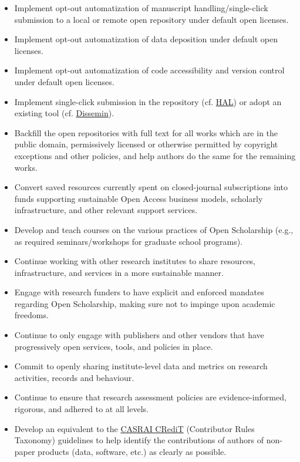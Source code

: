 \begin{itemize}
\item
  Implement opt-out automatization of manuscript handling/single-click
  submission to a local or remote open repository under default open
  licenses.
\item
  Implement opt-out automatization of data deposition under default open
  licenses.
\item
  Implement opt-out automatization of code accessibility and version
  control under default open licenses.
\item
  Implement single-click submission in the repository (cf.
  \href{https://www.ccsd.cnrs.fr/en/2018/06/new-interface-for-submitting-in-hal-a-first-assessment/}{HAL})
  or adopt an existing tool (cf. \href{https://dissem.in/}{Dissemin}).
\item
  Backfill the open repositories with full text for all works which are
  in the public domain, permissively licensed or otherwise permitted by
  copyright exceptions and other policies, and help authors do the same
  for the remaining works.
\item
  Convert saved resources currently spent on closed-journal
  subscriptions into funds supporting sustainable Open Access business
  models, scholarly infrastructure, and other relevant support services.
\item
  Develop and teach courses on the various practices of Open Scholarship
  (e.g., as required seminars/workshops for graduate school programs).
\item
  Continue working with other research institutes to share resources,
  infrastructure, and services in a more sustainable manner.
\item
  Engage with research funders to have explicit and enforced mandates
  regarding Open Scholarship, making sure not to impinge upon academic
  freedoms.
\item
  Continue to only engage with publishers and other vendors that have
  progressively open services, tools, and policies in place.
\item
  Commit to openly sharing institute-level data and metrics on research
  activities, records and behaviour.
\item
  Continue to ensure that research assessment policies are
  evidence-informed, rigorous, and adhered to at all levels.
\item
  Develop an equivalent to the
  \href{http://docs.casrai.org/CRediT}{CASRAI CRediT} (Contributor Rules
  Taxonomy) guidelines to help identify the contributions of authors of
  non-paper products (data, software, etc.) as clearly as possible.
\end{itemize}

